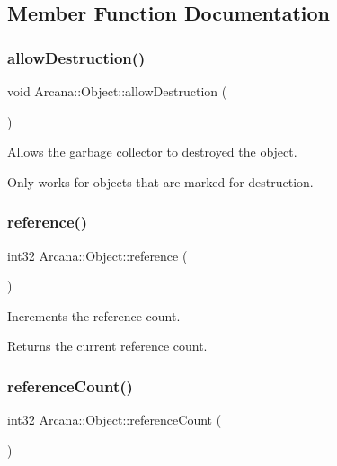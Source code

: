 \subsection{Member Function Documentation}
\mbox{\label{class_arcana_1_1_object_abd84158043b5d90a1f1c5647c0f04b9f}} 
\subsubsection{\texorpdfstring{allow\+Destruction()}{allowDestruction()}}
{\footnotesize\ttfamily void Arcana\+::\+Object\+::allow\+Destruction (\begin{DoxyParamCaption}{ }\end{DoxyParamCaption})}



Allows the garbage collector to destroyed the object. 

Only works for objects that are marked for destruction. \mbox{\label{class_arcana_1_1_object_aee21c11c6df1f204288c55cab27139fe}} 
\subsubsection{\texorpdfstring{reference()}{reference()}}
{\footnotesize\ttfamily int32 Arcana\+::\+Object\+::reference (\begin{DoxyParamCaption}{ }\end{DoxyParamCaption})\hspace{0.3cm}{\ttfamily [virtual]}}



Increments the reference count. 

Returns the current reference count. \mbox{\label{class_arcana_1_1_object_ae9a43cf92c71ea1e5a672b40e9a99f19}} 
\subsubsection{\texorpdfstring{reference\+Count()}{referenceCount()}}
{\footnotesize\ttfamily int32 Arcana\+::\+Object\+::reference\+Count (\begin{DoxyParamCaption}{ }\end{DoxyParamCaption})\hspace{0.3cm}{\ttfamily [virtual]}}



